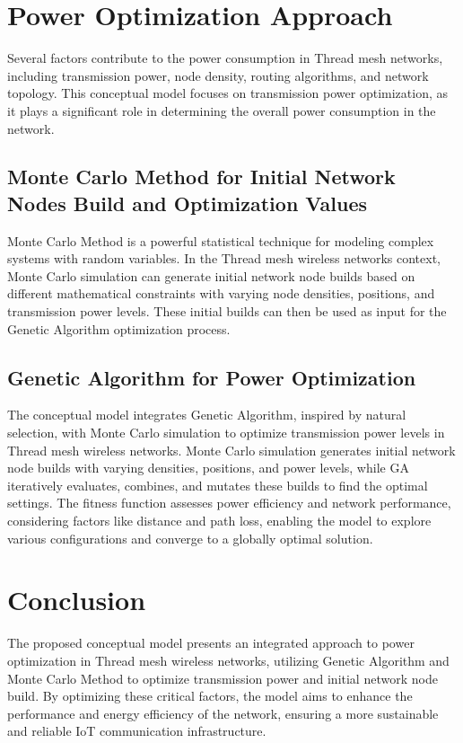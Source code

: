 \section{Power Optimization Approach}\label{sec:power_optimization_approach}
Several factors contribute to the power consumption in Thread mesh networks, including transmission power, node density, routing algorithms, and network topology. This conceptual model focuses on transmission power optimization, as it plays a significant role in determining the overall power consumption in the network.

\subsection{Monte Carlo Method for Initial Network Nodes Build and Optimization Values}
Monte Carlo Method is a powerful statistical technique for modeling complex systems with random variables. In the Thread mesh wireless networks context, Monte Carlo simulation can generate initial network node builds based on different mathematical constraints with varying node densities, positions, and transmission power levels. These initial builds can then be used as input for the Genetic Algorithm optimization process.

\subsection{Genetic Algorithm for Power Optimization}
The conceptual model integrates Genetic Algorithm, inspired by natural selection, with Monte Carlo simulation to optimize transmission power levels in Thread mesh wireless networks. Monte Carlo simulation generates initial network node builds with varying densities, positions, and power levels, while GA iteratively evaluates, combines, and mutates these builds to find the optimal settings. The fitness function assesses power efficiency and network performance, considering factors like distance and path loss, enabling the model to explore various configurations and converge to a globally optimal solution.

\section{Conclusion}
The proposed conceptual model presents an integrated approach to power optimization in Thread mesh wireless networks, utilizing Genetic Algorithm and Monte Carlo Method to optimize transmission power and initial network node build. By optimizing these critical factors, the model aims to enhance the performance and energy efficiency of the network, ensuring a more sustainable and reliable IoT communication infrastructure.
